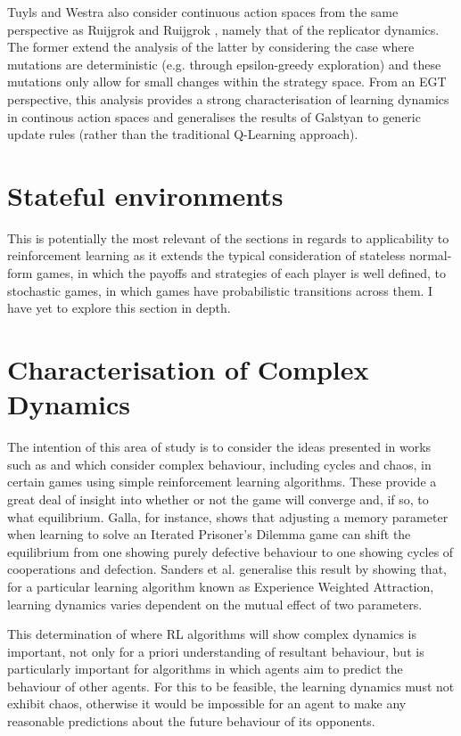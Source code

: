 \documentclass[../sample.tex]{subfiles}
\begin{document}
    Tuyls and Westra \cite{TuylesWestra} also consider continuous action spaces from the same
    perspective as Ruijgrok and Ruijgrok \cite{Ruijgrok}, namely that of the replicator dynamics.
    The former extend the analysis of the latter by considering the case where mutations are
    deterministic (e.g. through epsilon-greedy exploration) and these mutations only allow for small
    changes within the strategy space. From an EGT perspective, this analysis provides a strong
    characterisation of learning dynamics in continous action spaces and generalises the results of
    Galstyan to generic update rules (rather than the traditional Q-Learning approach). 

    \section{Stateful environments} \label{sec::Stateful}

    This is potentially the most relevant of the sections in regards to applicability to
    reinforcement learning as it extends the typical consideration of stateless normal-form games,
    in which the payoffs and strategies of each player is well defined, to stochastic games, in
    which games have probabilistic transitions across them. I have yet to explore this section in
    depth.

    \section{Characterisation of Complex Dynamics}

    The intention of this area of study is to consider the ideas presented in works such as 
    \cite{Sanders2018} and \cite{Galla2011} which consider complex behaviour, including cycles and
    chaos, in certain games using simple reinforcement learning algorithms. These provide a great
    deal of insight into whether or not the game will converge and, if so, to what equilibrium.
    Galla, for instance, shows that adjusting a memory parameter when learning to solve an Iterated
    Prisoner's Dilemma game can shift the equilibrium from one showing purely defective behaviour to
    one showing cycles of cooperations and defection. Sanders et al. generalise this result by
    showing that, for a particular learning algorithm known as Experience Weighted Attraction,
    learning dynamics varies dependent on the mutual effect of two parameters. 

    This determination of where RL algorithms will show complex dynamics is important, not only for
    a priori understanding of resultant behaviour, but is particularly important for algorithms in
    which agents aim to predict the behaviour of other agents. For this to be feasible, the learning
    dynamics must not exhibit chaos, otherwise it would be impossible for an agent to make any
    reasonable predictions about the future behaviour of its opponents. 
    
\end{document}
